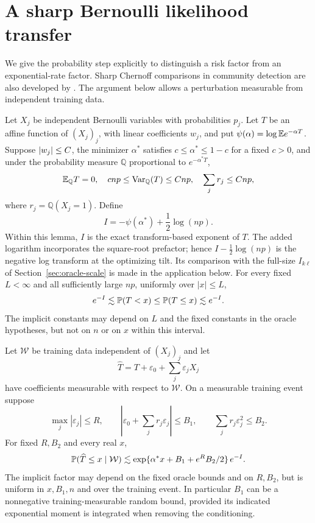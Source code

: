 \section{A sharp Bernoulli likelihood transfer}\label{sec:sharp}

We give the probability step explicitly to distinguish a risk factor from
an exponential-rate factor. Sharp Chernoff comparisons in community
detection are also developed by \citet{zhouli}.
The argument below allows a perturbation measurable from independent
training data.

\begin{lemma}
\label{lem:sharp}
Let $X_j$ be independent Bernoulli variables with probabilities $p_j$.
Let $T$ be an affine function of $(X_j)_j$, with linear coefficients
$w_j$, and put $\psi(\alpha)=\log\mathbb E e^{-\alpha T}$.
Suppose $\left\lvert w_j\right\rvert\le C$, the minimizer $\alpha^*$ satisfies
$c\le \alpha^*\le1-c$ for a fixed $c>0$, and under the probability
measure $\mathbb{Q}$ proportional to $e^{-\alpha^*T}$,
\begin{equation}\label{eq:sharp-premises}
 \mathbb E_{\mathbb{Q}} T=0,\quad c{np}\le\operatorname{Var}_{\mathbb{Q}}(T)\le C{np},
 \quad\sum_jr_j\le C{np},
\end{equation}
where $r_j=\mathbb{Q}(X_j=1)$. Define
\[
 I=-\psi(\alpha^*)+\frac12\log(np).
\]
Within this lemma, $I$ is the exact transform-based exponent of $T$.
The added logarithm incorporates the square-root prefactor; hence
$I-\tfrac12\log(np)$ is the negative log transform at the optimizing
tilt. Its comparison with the full-size $I_{k\ell}$ of
Section~\ref{sec:oracle-scale} is made in the application below.
For every fixed $L<\infty$ and all sufficiently large ${np}$, uniformly over
$|x|\le L$,
\begin{equation}\label{eq:sharp-oracle}
 e^{-I}\lesssim\mathbb P(T<x)
 \le\mathbb P(T\le x)\lesssim e^{-I}.
\end{equation}
The implicit constants may depend on $L$ and the fixed constants in
the oracle hypotheses, but not on $n$ or on $x$ within this interval.

Let $\mathcal W$ be training data independent of $(X_j)_j$ and let
\[
 \widehat T=T+\varepsilon_0+\sum_j\varepsilon_jX_j
\]
have coefficients measurable with respect to $\mathcal W$. On a measurable
training event suppose
\begin{equation}\label{eq:tilt-error}
 \max_j|\varepsilon_j|\le R,\qquad
 \left|\varepsilon_0+\sum_jr_j\varepsilon_j\right|\le B_1,\qquad
 \sum_jr_j\varepsilon_j^2\le B_2.
\end{equation}
For fixed $R,B_2$ and every real $x$,
\begin{equation}\label{eq:sharp-transfer}
 \mathbb P(\widehat T\le x\mid\mathcal W)
 \lesssim\exp\{\alpha^*x+B_1+e^R B_2/2\}\,e^{-I}.
\end{equation}
The implicit factor may depend on the fixed oracle bounds and on
$R,B_2$, but is uniform in $x,B_1,n$ and over the training event.
In particular $B_1$ can
be a nonnegative training-measurable random bound, provided its indicated
exponential moment is integrated when removing the conditioning.
\end{lemma}

